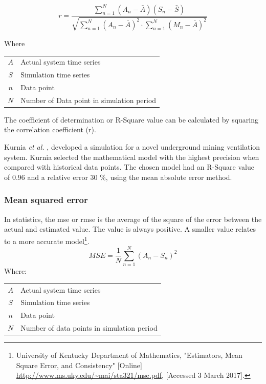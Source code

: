  		\begin{equation}
 		\label{eq: Correlation coefficient}
 		r = \dfrac{\sum_{n=1}^{N}(A_n - \bar{A})(S_n - \bar{S})}{\sqrt{\sum_{n=1}^{N}(A_n - \bar{A})^2 \cdot \sum_{n=1}^{N}(M_n - \bar{A})^2}}
 		\end{equation}
 		\par
 		Where \par
 		\begin{table}[h!]
 			\centering
 			\begin{tabular}{cl}
 				$A$ & Actual system time series \\
 				$S$ & Simulation time series \\
 				$n$ & Data point \\
 				$N$ & Number of Data point in simulation period \\
 			\end{tabular} 
 		\end{table}	
 		The coefficient of determination or R-Square value can be calculated by squaring the correlation coefficient (r). 
 		\par 
 			Kurnia \textit{et al.} \cite{kurnia2014simulation}, \cite{kurnia2014dust} developed a simulation for a novel underground mining ventilation system. Kurnia selected the mathematical model with the highest precision when compared with historical data points. The chosen model had an R-Square value of 0.96 and a relative error 30 \%, using the mean absolute error method. 
 			
 		\subsubsection{Mean squared error}	
 		In statistics, the \gls{mse} or \gls{rmse} is the average of the square of the error between the actual and estimated value. The value is always positive. A smaller value relates to a more accurate model\footnote{University of Kentucky Department of Mathematics, "Estimators, Mean Square Error, and
 			Consistency" [Online] \url{http://www.ms.uky.edu/~mai/sta321/mse.pdf}, [Accessed 3 March 2017].}.
 			\begin{equation}
 				\label{eq: rmse}
 				MSE = \dfrac{1}{N}\sum_{n=1}^{N}{(A_{n} - S_{n})^2}
 			\end{equation}
 			Where: \par
 			\begin{table}[h!]
 				\centering
 				\begin{tabular}{cl}
 					$A$ & Actual system time series \\
 					$S$ & Simulation time series \\
 					$n$ & Data point \\
 					$N$ & Number of data points in simulation period \\
 			\end{tabular} 
 			\end{table}			
